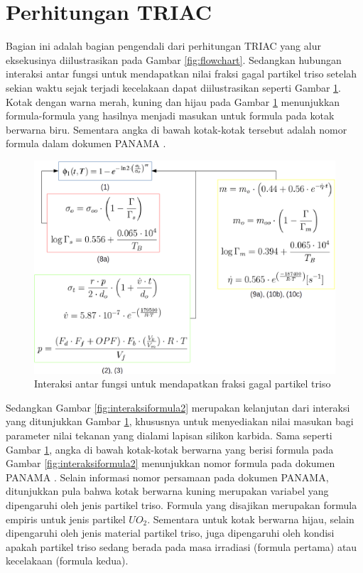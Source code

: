 \documentclass[a4paper,11pt]{report}
\begin{document}
\section{Perhitungan TRIAC}
Bagian ini adalah bagian pengendali dari perhitungan TRIAC yang alur eksekusinya diilustrasikan pada Gambar \ref{fig:flowchart}. Sedangkan hubungan interaksi antar fungsi untuk mendapatkan nilai fraksi gagal partikel triso setelah sekian waktu sejak terjadi kecelakaan dapat diilustrasikan seperti Gambar \ref{fig:interaksiformula}. Kotak dengan warna merah, kuning dan hijau pada Gambar \ref{fig:interaksiformula} menunjukkan formula-formula yang hasilnya menjadi masukan untuk formula pada kotak berwarna biru. Sementara angka di bawah kotak-kotak tersebut adalah nomor formula dalam dokumen PANAMA \cite{report1}.

\begin{figure}[h]
  \begin{center}
    \includegraphics[scale=.5]{pics/alurRumus1.png}
    \caption{Interaksi antar fungsi untuk mendapatkan fraksi gagal partikel triso}
    \label{fig:interaksiformula}
  \end{center}
\end{figure}


Sedangkan Gambar \ref{fig:interaksiformula2} merupakan kelanjutan dari interaksi yang ditunjukkan Gambar \ref{fig:interaksiformula}, khususnya untuk menyediakan nilai masukan bagi parameter nilai tekanan yang dialami lapisan silikon karbida. Sama seperti Gambar \ref{fig:interaksiformula}, angka di bawah kotak-kotak berwarna yang berisi formula pada Gambar \ref{fig:interaksiformula2} menunjukkan nomor formula pada dokumen PANAMA \cite{report1}. Selain informasi nomor persamaan pada dokumen PANAMA, ditunjukkan pula bahwa kotak berwarna kuning merupakan variabel yang dipengaruhi oleh jenis partikel triso. Formula yang disajikan merupakan formula empiris untuk jenis partikel $UO_2$. Sementara untuk kotak berwarna hijau, selain dipengaruhi oleh jenis material partikel triso, juga dipengaruhi oleh kondisi apakah partikel triso sedang berada pada masa irradiasi (formula pertama) atau kecelakaan (formula kedua). 
\end{document}
